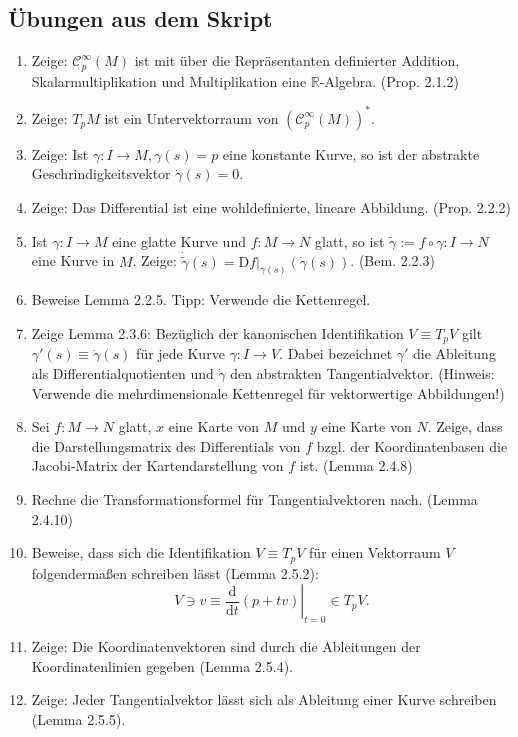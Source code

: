 \documentclass[a4paper]{scrartcl}
\newcommand{\D}{\mathrm{d}}
\newcommand{\DD}{\mathrm{D}}
\newcommand{\sC}{\mathcal{C}^{\infty}}
\begin{document}
	\subsection{Übungen aus dem Skript}
	\begin{enumerate}
		\item Zeige: $\sC_p(M)$ ist mit über die Repräsentanten definierter Addition, Skalarmultiplikation und Multiplikation eine $\mathbb R$-Algebra. (Prop. 2.1.2)
		\item Zeige: $T_pM$ ist ein Untervektorraum von $(\sC_p(M))^*$.
		\item Zeige: Ist $\gamma\colon I\to M, \gamma(s) = p$ eine konstante Kurve, so ist der abstrakte Geschrindigkeitsvektor $\dot\gamma(s) = 0$.
		\item Zeige: Das Differential ist eine wohldefinierte, lineare Abbildung. (Prop. 2.2.2)
		\item Ist $\gamma\colon I \to M$ eine glatte Kurve und $f\colon M \to N$ glatt, so ist $\tilde\gamma := f\circ\gamma \colon I \to N$ eine Kurve in $M$. Zeige: $\dot{\tilde\gamma}(s) = \left.\DD f\right|_{\gamma(s)} (\dot\gamma(s))$. (Bem. 2.2.3)
		\item Beweise Lemma 2.2.5. Tipp: Verwende die Kettenregel.
		\item Zeige Lemma 2.3.6: Bezüglich der kanonischen Identifikation $V\equiv T_pV$ gilt $\gamma'(s) \equiv \dot\gamma(s)$ für jede Kurve $\gamma\colon I\rightarrow V$. Dabei bezeichnet $\gamma'$ die Ableitung als Differentialquotienten und $\dot{\gamma}$ den abstrakten Tangentialvektor. (Hinweis: Verwende die mehrdimensionale Kettenregel für vektorwertige Abbildungen!)
		\item Sei $f\colon M \to N$ glatt, $x$ eine Karte von $M$ und $y$ eine Karte von $N$. Zeige, dass die Darstellungsmatrix des Differentials von $f$ bzgl. der Koordinatenbasen die Jacobi-Matrix der Kartendarstellung von $f$ ist. (Lemma 2.4.8)
		\item Rechne die Transformationsformel für Tangentialvektoren nach. (Lemma 2.4.10)
		\item Beweise, dass sich die Identifikation $V\equiv T_pV$ für einen Vektorraum $V$ folgendermaßen schreiben lässt (Lemma 2.5.2): 
		\[V \ni v \equiv \left.\frac{\D}{\D t}(p + tv)\right|_{t=0} \in T_pV.\]
		\item Zeige: Die Koordinatenvektoren sind durch die Ableitungen der Koordinatenlinien gegeben (Lemma 2.5.4).
		\item Zeige: Jeder Tangentialvektor lässt sich als Ableitung einer Kurve schreiben (Lemma 2.5.5).
	\end{enumerate}
\end{document}
